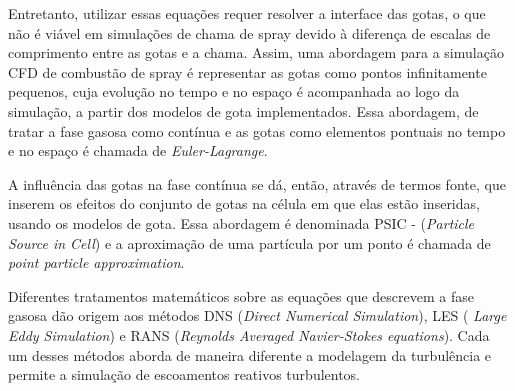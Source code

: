 Entretanto, utilizar essas equações requer resolver a interface das gotas, o  que não é viável em simulações de chama de spray devido à diferença de escalas de comprimento entre as gotas e a chama.
Assim, uma abordagem para a simulação CFD de combustão de spray é representar as gotas como pontos infinitamente pequenos, cuja evolução no tempo e no espaço é acompanhada ao logo da simulação, a partir dos modelos de gota implementados.
Essa abordagem, de tratar a fase gasosa como contínua e as gotas como elementos pontuais no tempo e no espaço é chamada de \emph{Euler-Lagrange}.

A influência das gotas na fase contínua se dá, então, através de termos fonte, que inserem os efeitos do conjunto de gotas na célula em que elas estão inseridas, usando os modelos de gota. 
Essa abordagem é denominada PSIC - (\emph{Particle Source in Cell}) e a aproximação de uma partícula por um ponto é chamada de \emph{point particle approximation}.

Diferentes tratamentos matemáticos sobre as equações que descrevem a fase gasosa dão origem aos métodos DNS (\emph{Direct Numerical Simulation}), LES ( \emph{Large Eddy Simulation}) e RANS (\emph{Reynolds Averaged Navier-Stokes equations}). 
Cada um desses métodos aborda de maneira diferente a modelagem da turbulência e permite a simulação de escoamentos reativos turbulentos.

